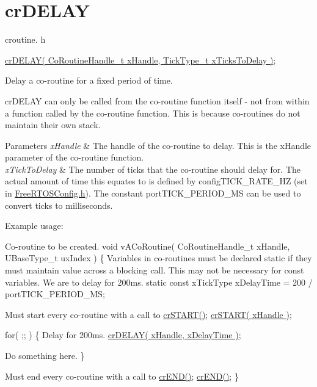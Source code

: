 \hypertarget{group__crDELAY}{\section{cr\-D\-E\-L\-A\-Y}
\label{group__crDELAY}
}
croutine. h 
\begin{DoxyPre}
 \hyperlink{croutine_8h_a05a06feb11028f2d1d440ea335f562ba}{crDELAY( CoRoutineHandle\_t xHandle, TickType\_t xTicksToDelay )};\end{DoxyPre}


Delay a co-\/routine for a fixed period of time.

cr\-D\-E\-L\-A\-Y can only be called from the co-\/routine function itself -\/ not from within a function called by the co-\/routine function. This is because co-\/routines do not maintain their own stack.


\begin{DoxyParams}{Parameters}
{\em x\-Handle} & The handle of the co-\/routine to delay. This is the x\-Handle parameter of the co-\/routine function.\\
\hline
{\em x\-Tick\-To\-Delay} & The number of ticks that the co-\/routine should delay for. The actual amount of time this equates to is defined by config\-T\-I\-C\-K\-\_\-\-R\-A\-T\-E\-\_\-\-H\-Z (set in \hyperlink{FreeRTOSConfig_8h}{Free\-R\-T\-O\-S\-Config.\-h}). The constant port\-T\-I\-C\-K\-\_\-\-P\-E\-R\-I\-O\-D\-\_\-\-M\-S can be used to convert ticks to milliseconds.\\
\hline
\end{DoxyParams}
Example usage\-: 
\begin{DoxyPre}
Co-routine to be created.
 void vACoRoutine( CoRoutineHandle\_t xHandle, UBaseType\_t uxIndex )
 \{
Variables in co-routines must be declared static if they must maintain value across a blocking call.
This may not be necessary for const variables.
We are to delay for 200ms.
 static const xTickType xDelayTime = 200 / portTICK\_PERIOD\_MS;\end{DoxyPre}



\begin{DoxyPre}Must start every co-routine with a call to \hyperlink{croutine_8h_a19a57a201a325e8af1207ed68c4aedde}{crSTART()};
     \hyperlink{croutine_8h_a19a57a201a325e8af1207ed68c4aedde}{crSTART( xHandle )};\end{DoxyPre}



\begin{DoxyPre}     for( ;; )
     \{
Delay for 200ms.
        \hyperlink{croutine_8h_a05a06feb11028f2d1d440ea335f562ba}{crDELAY( xHandle, xDelayTime )};\end{DoxyPre}



\begin{DoxyPre}Do something here.
     \}\end{DoxyPre}



\begin{DoxyPre}Must end every co-routine with a call to \hyperlink{croutine_8h_ae6038cc976689b50000475ebfc4e2f23}{crEND()};
     \hyperlink{croutine_8h_ae6038cc976689b50000475ebfc4e2f23}{crEND()};
 \}\end{DoxyPre}
 